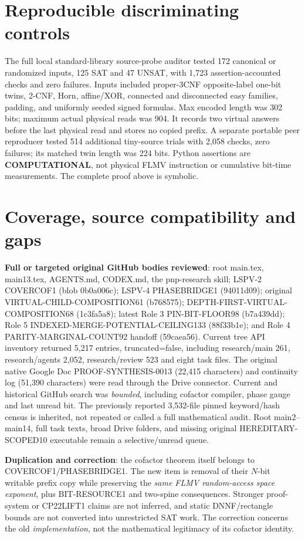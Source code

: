 \documentclass[11pt]{article}
\begin{document}
\section{Reproducible discriminating controls}
The full local standard-library source-probe auditor tested 172 canonical or randomized inputs, 125 SAT and 47 UNSAT, with 1,723 assertion-accounted checks and zero failures. Inputs included proper-3CNF opposite-label one-bit twins, 2-CNF, Horn, affine/XOR, connected and disconnected easy families, padding, and uniformly seeded signed formulas. Max encoded length was 302 bits; maximum actual physical reads was 904. It records two virtual answers before the last physical read and stores no copied prefix. A separate portable peer reproducer tested 514 additional tiny-source trials with 2,058 checks, zero failures; its matched twin length was 224 bits. Python assertions are \textbf{COMPUTATIONAL}, not physical FLMV instruction or cumulative bit-time measurements. The complete proof above is symbolic.

\section{Coverage, source compatibility and gaps}
\textbf{Full or targeted original GitHub bodies reviewed}: root main.tex, main13.tex, AGENTS.md, CODEX.md, the pnp-research skill; LSPV-2 COVERCOF1 (blob 0b0a006c); LSPV-4 PHASEBRIDGE1 (94011d09); original VIRTUAL-CHILD-COMPOSITION61 (b768575); DEPTH-FIRST-VIRTUAL-COMPOSITION68 (1c3fa5a8); latest Role 3 PIN-BIT-FLOOR98 (b7a439dd); Role 5 INDEXED-MERGE-POTENTIAL-CEILING133 (88f33b1e); and Role 4 PARITY-MARGINAL-COUNT92 handoff (59caea56). Current tree API inventory returned 5,217 entries, truncated=false, including research/main 261, research/agents 2,052, research/review 523 and eight task files. The original native Google Doc PROOF-SYNTHESIS-0013 (22,415 characters) and continuity log (51,390 characters) were read through the Drive connector. Current and historical GitHub search was \emph{bounded}, including cofactor compiler, phase gauge and last unread bit. The previously reported 3,532-file pinned keyword/hash census is inherited, not repeated or called a full mathematical audit. Root main2--main14, full task texts, broad Drive folders, and missing original HEREDITARY-SCOPED10 executable remain a selective/unread queue.

\textbf{Duplication and correction}: the cofactor theorem itself belongs to COVERCOF1/PHASEBRIDGE1. The new item is removal of their $N$-bit writable prefix copy while preserving the \emph{same FLMV random-access space exponent}, plus BIT-RESOURCE1 and two-spine consequences. Stronger proof-system or CP22LIFT1 claims are not inferred, and static DNNF/rectangle bounds are not converted into unrestricted SAT work. The correction concerns the old \emph{implementation}, not the mathematical legitimacy of its cofactor identity.
\end{document}
